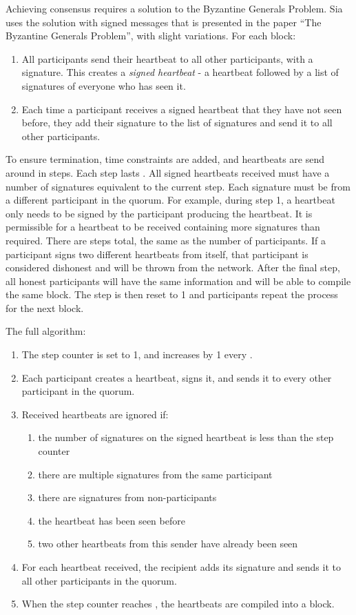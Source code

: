 \documentclass[twocolumn]{article}
\begin{document}
Achieving consensus requires a solution to the Byzantine Generals Problem.
Sia uses the solution with signed messages that is presented in the paper ``The Byzantine Generals Problem'', with slight variations. %
For each block:
\begin{enumerate}
	\item All participants send their heartbeat to all other participants, with a signature.
	This creates a \textit{signed heartbeat} - a heartbeat followed by a list of signatures of everyone who has seen it.
	\item Each time a participant receives a signed heartbeat that they have not seen before, they add their signature to the list of signatures and send it to all other participants.
\end{enumerate}
To ensure termination, time constraints are added, and heartbeats are send around in steps.
Each step lasts \stepduration{}.
All signed heartbeats received must have a number of signatures equivalent to the current step.
Each signature must be from a different participant in the quorum.
For example, during step 1, a heartbeat only needs to be signed by the participant producing the heartbeat.
It is permissible for a heartbeat to be received containing more signatures than required.
There are \quorumsize{} steps total, the same as the number of participants.
If a participant signs two different heartbeats from itself, that participant is considered dishonest and will be thrown from the network.
After the final step, all honest participants will have the same information and will be able to compile the same block.
The step is then reset to 1 and participants repeat the process for the next block.
\vfill\break

The full algorithm:
\begin{enumerate}
	\item The step counter is set to 1, and increases by 1 every \stepduration{}.
	\item Each participant creates a heartbeat, signs it, and sends it to every other participant in the quorum.
	\item Received heartbeats are ignored if:
	\begin{enumerate}
		\item the number of signatures on the signed heartbeat is less than the step counter
		\item there are multiple signatures from the same participant
		\item there are signatures from non-participants
		\item the heartbeat has been seen before
		\item two other heartbeats from this sender have already been seen
	\end{enumerate}
	\item For each heartbeat received, the recipient adds its signature and sends it to all other participants in the quorum.
	\item When the step counter reaches \quorumsize{}, the heartbeats are compiled into a block.
\end{enumerate}
\end{document}
